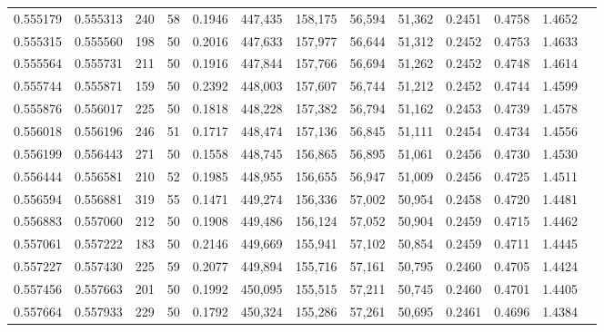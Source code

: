 \begin{tabular}{rrrrrrrrrrrrr}
0.555179 & 0.555313 &   240 &  58 &                                     0.1946 & 447,435 & 158,175 &  56,594 &  51,362 & 0.2451 & 0.4758 & 1.4652 \\
0.555315 & 0.555560 &   198 &  50 &                                     0.2016 & 447,633 & 157,977 &  56,644 &  51,312 & 0.2452 & 0.4753 & 1.4633 \\
0.555564 & 0.555731 &   211 &  50 &                                     0.1916 & 447,844 & 157,766 &  56,694 &  51,262 & 0.2452 & 0.4748 & 1.4614 \\
0.555744 & 0.555871 &   159 &  50 &                                     0.2392 & 448,003 & 157,607 &  56,744 &  51,212 & 0.2452 & 0.4744 & 1.4599 \\
0.555876 & 0.556017 &   225 &  50 &                                     0.1818 & 448,228 & 157,382 &  56,794 &  51,162 & 0.2453 & 0.4739 & 1.4578 \\
0.556018 & 0.556196 &   246 &  51 &                                     0.1717 & 448,474 & 157,136 &  56,845 &  51,111 & 0.2454 & 0.4734 & 1.4556 \\
0.556199 & 0.556443 &   271 &  50 &                                     0.1558 & 448,745 & 156,865 &  56,895 &  51,061 & 0.2456 & 0.4730 & 1.4530 \\
0.556444 & 0.556581 &   210 &  52 &                                     0.1985 & 448,955 & 156,655 &  56,947 &  51,009 & 0.2456 & 0.4725 & 1.4511 \\
0.556594 & 0.556881 &   319 &  55 &                                     0.1471 & 449,274 & 156,336 &  57,002 &  50,954 & 0.2458 & 0.4720 & 1.4481 \\
0.556883 & 0.557060 &   212 &  50 &                                     0.1908 & 449,486 & 156,124 &  57,052 &  50,904 & 0.2459 & 0.4715 & 1.4462 \\
0.557061 & 0.557222 &   183 &  50 &                                     0.2146 & 449,669 & 155,941 &  57,102 &  50,854 & 0.2459 & 0.4711 & 1.4445 \\
0.557227 & 0.557430 &   225 &  59 &                                     0.2077 & 449,894 & 155,716 &  57,161 &  50,795 & 0.2460 & 0.4705 & 1.4424 \\
0.557456 & 0.557663 &   201 &  50 &                                     0.1992 & 450,095 & 155,515 &  57,211 &  50,745 & 0.2460 & 0.4701 & 1.4405 \\
0.557664 & 0.557933 &   229 &  50 &                                     0.1792 & 450,324 & 155,286 &  57,261 &  50,695 & 0.2461 & 0.4696 & 1.4384 \\

\end{tabular}
